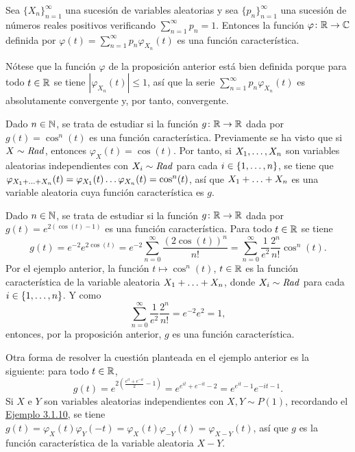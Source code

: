 \documentclass[a4paper, 11pt, extrafontsizes]{memoir}
\begin{document}
\begin{proposition}
    Sea $\{X_n\}_{n=1}^\infty$ una sucesión de  variables aleatorias y sea $\{p_n\}_{n=1}^\infty$ una sucesión de números reales positivos verificando $\sum_{n=1}^\infty p_n = 1$. Entonces la función $\varphi \colon \mathbb R \to \mathbb C$ definida por $\varphi(t) =\sum_{n=1}^\infty p_n\varphi_{X_n}(t)$ es una función característica.
\end{proposition}

Nótese que la función $\varphi$ de la proposición anterior está bien definida porque para todo $t \in \mathbb R$ se tiene $|\varphi_{X_n}(t)| \leq 1$, así que la serie $\sum_{n=1}^\infty p_n\varphi_{X_n}(t)$ es absolutamente convergente y, por tanto, convergente.

\begin{example}
    Dado $n \in \mathbb N$, se trata de estudiar si la función $g \colon \mathbb R \to \mathbb R$ dada por $g(t)=\cos^n(t)$ es una función característica. Previamente se ha visto que si $X \sim \textup{\emph{Rad}}$, entonces $\varphi_X(t)=\cos(t)$. Por tanto, si $X_1,\mathellipsis,X_n$ son variables aleatorias independientes con $X_i \sim \textup{\emph{Rad}}$ para cada $i \in \{1,\mathellipsis,n\}$, se tiene que $\varphi_{X_1+\mathellipsis+X_n}(t) = \varphi_{X_1}(t)\mathellipsis\varphi_{X_n}(t) = \cos^n(t)$, así que $X_1+\mathellipsis+X_n$ es una variable aleatoria cuya función característica es $g$.
\end{example}

\begin{example}
    Dado $n \in \mathbb N$, se trata de estudiar si la función $g \colon \mathbb R \to \mathbb R$ dada por $g(t)=e^{2(\cos(t)-1)}$ es una función característica. Para todo $t \in \mathbb R$ se tiene
    \[g(t)=e^{-2}e^{2\cos(t)} = e^{-2}\sum_{n=0}^\infty\frac{(2\cos(t))^n}{n!} = \sum_{n=0}^\infty\frac{1}{e^2}\frac{2^n}{n!}\cos^n(t).\]
    Por el ejemplo anterior, la función $t \mapsto \cos^n(t)$, $t \in \mathbb R$ es la función característica de la variable aleatoria $X_1+\mathellipsis+X_n$, donde $X_i \sim \textup{\emph{Rad}}$ para cada $i \in \{1,\mathellipsis,n\}$. Y como
    \[\sum_{n=0}^\infty \frac{1}{e^2}\frac{2^n}{n!} = e^{-2}e^2 = 1,\]
    entonces, por la proposición anterior, $g$ es una función característica.
\end{example}

\begin{example}
    Otra forma de resolver la cuestión planteada en el ejemplo anterior es la siguiente: para todo $t \in \mathbb R$,
    \[g(t)=e^{2(\frac{e^{it}+e^{-it}}{2}-1)} = e^{e^{it}+e^{-it}-2} = e^{e^{it}-1}e^{-it-1}.\]
    Si $X$ e $Y$ son variables aleatorias independientes con $X,Y \sim P(1)$, recordando el \hyperref[eje:1.9.8]{\color{gray}Ejemplo 3.1.10}, se tiene $g(t)=\varphi_X(t)\varphi_Y(-t) = \varphi_X(t)\varphi_{-Y}(t) = \varphi_{X-Y}(t)$, así que $g$ es la función característica de la variable aleatoria $X-Y$.
\end{example}
\end{document}
